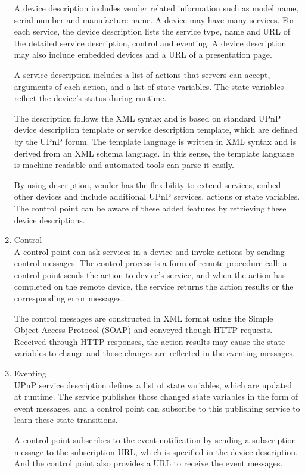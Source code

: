 \begin{enumerate}
A device description includes vender related information such as model name, serial number and 
manufacture name. A device may have many services. For each service, the device description lists 
the service type, name and URL of the detailed service description, control and eventing. A device 
description may also include embedded devices and a URL of a presentation page. 

A service description includes a list of actions that servers can accept, arguments of each action, 
and a list of state variables. The state variables reflect the device's status during runtime. 

The description follows the XML syntax and is based on standard UPnP device description template or service description template, which are defined by the UPnP forum. The template language is written in XML syntax and is derived from an XML schema language. In this sense, the template language is machine-readable and automated tools can parse it easily. 

By using description, vender has the flexibility to extend services, embed other devices and include 
additional UPnP services, actions or state variables. The control point can be aware of these added features by retrieving these device descriptions. 
\item Control \\ 
A control point can ask services in a device and invoke actions by sending control messages. The control process is a form of remote procedure call: a control point sends the action to device's service, and when the action has completed on the remote device, the service returns the action results or the corresponding error messages. 

The control messages are constructed in XML format using the Simple Object Access Protocol (SOAP) and conveyed though HTTP requests. Received through HTTP responses, the action results may cause the state variables to change and those changes are reflected in the eventing messages. 
\item Eventing \\ 
UPnP service description defines a list of state variables, which are updated at runtime. The service 
publishes those changed state variables in the form of event messages, and a control point can 
subscribe to this publishing service to learn these state transitions. 

A control point subscribes to the event notification by sending a subscription message to the 
subscription URL, which is specified in the device description. And the control point also provides a URL to receive the event messages. 


\end{enumerate}
